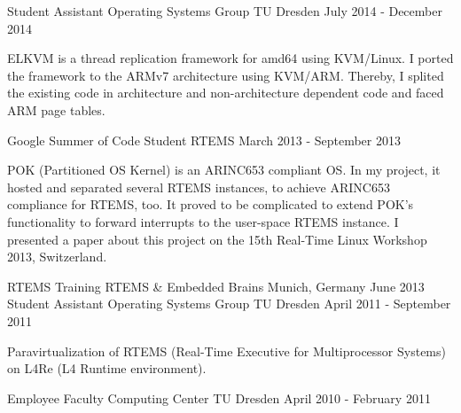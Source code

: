 \begin{cventries}
  \cventry
    {Student Assistant}
    {Operating Systems Group}
    {TU Dresden}
    {July 2014 - December 2014}
    {
      \begin{cvitems}
      \item[] {ELKVM is a thread replication framework for amd64 using KVM/Linux.
      I ported the framework to the ARMv7 architecture using
      KVM/ARM. Thereby, I splited the existing code in architecture and
    non-architecture dependent code and faced ARM page tables. }
      \end{cvitems}
    }
  \cventry
    {Google Summer of Code Student}
    {RTEMS}
    {}
    {March 2013 - September 2013}
    {
      \begin{cvitems}
      \item[] {POK (Partitioned OS Kernel) is an ARINC653 compliant OS. In my
	  project, it hosted and separated several RTEMS instances, to achieve
      ARINC653 compliance for RTEMS, too. It proved to be complicated to extend
      POK's functionality to forward interrupts to the user-space RTEMS
      instance. I presented a paper about this project on the 15th Real-Time Linux
    Workshop 2013, Switzerland.}
      \end{cvitems}
    }
  \cventry
    {RTEMS Training}
    {RTEMS \& Embedded Brains}
    {Munich, Germany}
    {June 2013}
    {
    }
  \cventry
    {Student Assistant}
    {Operating Systems Group}
    {TU Dresden}
    {April 2011 - September 2011}
    {
      \begin{cvitems}
      \item[] {Paravirtualization of RTEMS (Real-Time Executive for
	Multiprocessor Systems) on L4Re (L4 Runtime environment).}
      \end{cvitems}
    }
  \cventry
    {Employee}
    {Faculty Computing Center}
    {TU Dresden}
    {April 2010 - February 2011}
    {}
\end{cventries}
